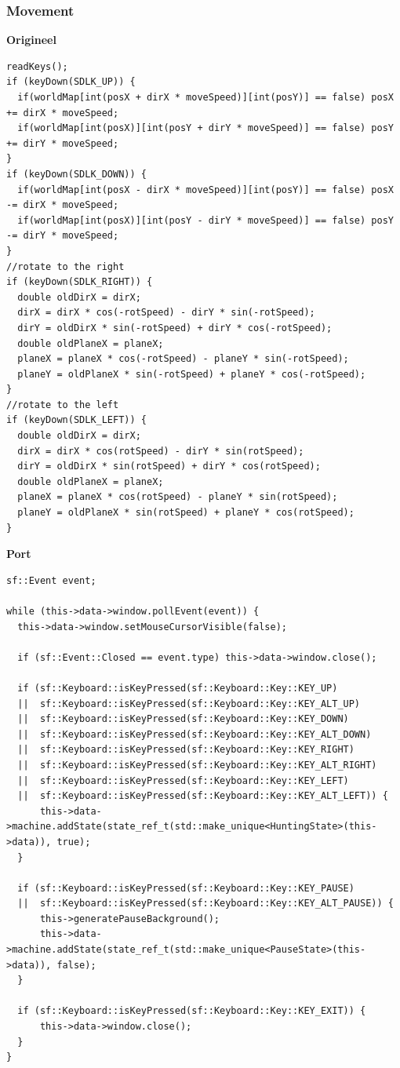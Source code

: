 \documentclass{report}
\begin{document}
    \subsubsection{Movement} %
    \label{ssub:movement}

\textbf{Origineel}
\begin{verbatim}
readKeys();
if (keyDown(SDLK_UP)) {
  if(worldMap[int(posX + dirX * moveSpeed)][int(posY)] == false) posX += dirX * moveSpeed;
  if(worldMap[int(posX)][int(posY + dirY * moveSpeed)] == false) posY += dirY * moveSpeed;
}
if (keyDown(SDLK_DOWN)) {
  if(worldMap[int(posX - dirX * moveSpeed)][int(posY)] == false) posX -= dirX * moveSpeed;
  if(worldMap[int(posX)][int(posY - dirY * moveSpeed)] == false) posY -= dirY * moveSpeed;
}
//rotate to the right
if (keyDown(SDLK_RIGHT)) {
  double oldDirX = dirX;
  dirX = dirX * cos(-rotSpeed) - dirY * sin(-rotSpeed);
  dirY = oldDirX * sin(-rotSpeed) + dirY * cos(-rotSpeed);
  double oldPlaneX = planeX;
  planeX = planeX * cos(-rotSpeed) - planeY * sin(-rotSpeed);
  planeY = oldPlaneX * sin(-rotSpeed) + planeY * cos(-rotSpeed);
}
//rotate to the left
if (keyDown(SDLK_LEFT)) {
  double oldDirX = dirX;
  dirX = dirX * cos(rotSpeed) - dirY * sin(rotSpeed);
  dirY = oldDirX * sin(rotSpeed) + dirY * cos(rotSpeed);
  double oldPlaneX = planeX;
  planeX = planeX * cos(rotSpeed) - planeY * sin(rotSpeed);
  planeY = oldPlaneX * sin(rotSpeed) + planeY * cos(rotSpeed);
}
\end{verbatim}
\newpage
\textbf{Port}
\begin{verbatim}
sf::Event event;

while (this->data->window.pollEvent(event)) {
  this->data->window.setMouseCursorVisible(false);

  if (sf::Event::Closed == event.type) this->data->window.close();

  if (sf::Keyboard::isKeyPressed(sf::Keyboard::Key::KEY_UP)
  ||  sf::Keyboard::isKeyPressed(sf::Keyboard::Key::KEY_ALT_UP)
  ||  sf::Keyboard::isKeyPressed(sf::Keyboard::Key::KEY_DOWN)
  ||  sf::Keyboard::isKeyPressed(sf::Keyboard::Key::KEY_ALT_DOWN)
  ||  sf::Keyboard::isKeyPressed(sf::Keyboard::Key::KEY_RIGHT)
  ||  sf::Keyboard::isKeyPressed(sf::Keyboard::Key::KEY_ALT_RIGHT)
  ||  sf::Keyboard::isKeyPressed(sf::Keyboard::Key::KEY_LEFT)
  ||  sf::Keyboard::isKeyPressed(sf::Keyboard::Key::KEY_ALT_LEFT)) {
      this->data->machine.addState(state_ref_t(std::make_unique<HuntingState>(this->data)), true);
  }

  if (sf::Keyboard::isKeyPressed(sf::Keyboard::Key::KEY_PAUSE)
  ||  sf::Keyboard::isKeyPressed(sf::Keyboard::Key::KEY_ALT_PAUSE)) {
      this->generatePauseBackground();
      this->data->machine.addState(state_ref_t(std::make_unique<PauseState>(this->data)), false);
  }

  if (sf::Keyboard::isKeyPressed(sf::Keyboard::Key::KEY_EXIT)) {
      this->data->window.close();
  }
}
\end{verbatim}
\end{document}
